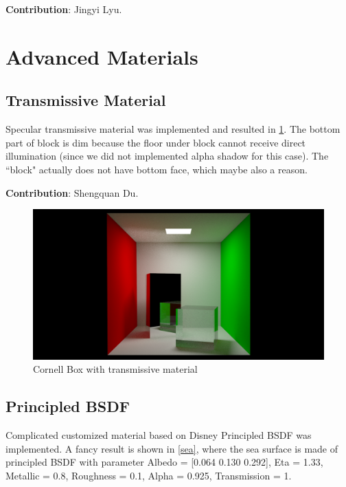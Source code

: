 \documentclass[acmtog]{acmart}
\begin{document}
\noindent \textbf{Contribution}: Jingyi Lyu. 

\section{Advanced Materials}

\subsection{Transmissive Material}

Specular transmissive material was implemented and resulted in \ref{cornell_transmissive}. The bottom part of block is dim because the floor under block cannot receive direct illumination (since we did not implemented alpha shadow for this case). The ``block" actually does not have bottom face, which maybe also a reason.

\noindent \textbf{Contribution}: Shengquan Du.

\begin{figure}[h]
	\centering	
	\includegraphics[width=\linewidth]{cornell_transmissive}
	\caption{Cornell Box with transmissive material}
	\label{cornell_transmissive}
\end{figure}

\subsection{Principled BSDF}

Complicated customized material based on Disney Principled BSDF was implemented. A fancy result is shown in \ref{sea}, where the sea surface is made of principled BSDF with parameter Albedo = [0.064 0.130 0.292], Eta = 1.33, Metallic = 0.8, Roughness = 0.1, Alpha = 0.925, Transmission = 1. 
\end{document}
